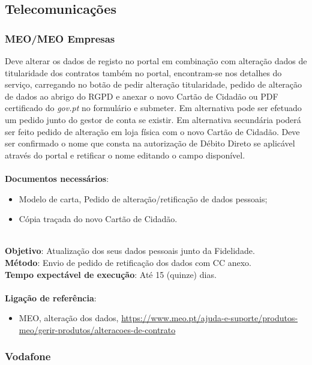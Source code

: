 \subsection{Telecomunicações}

\subsubsection{MEO/MEO Empresas}

Deve alterar os dados de registo no portal em combinação com alteração
dados de titularidade dos contratos também no portal, encontram-se nos
detalhes do serviço, carregando no botão de pedir alteração
titularidade, pedido de alteração de dados ao abrigo do RGPD e anexar o
novo Cartão de Cidadão ou PDF certificado do \emph{gov.pt} no formulário
e submeter. Em alternativa pode ser efetuado um pedido junto do gestor
de conta se existir. Em alternativa secundária poderá ser feito pedido
de alteração em loja física com o novo Cartão de Cidadão. Deve ser
confirmado o nome que consta na autorização de Débito Direto se
aplicável através do portal e retificar o nome editando o campo
disponível. \\
\\
\textbf{Documentos necessários}:
\begin{itemize}
	\item Modelo de carta, Pedido de alteração/retificação de dados pessoais;
	\item Cópia traçada do novo Cartão de Cidadão.
\end{itemize}
\leavevmode\\
\textbf{Objetivo}: Atualização dos seus dados pessoais junto da Fidelidade. \\
\textbf{Método}: Envio de pedido de retificação dos dados com CC anexo. \\
\textbf{Tempo expectável de execução}: Até 15 (quinze) dias. \\
\\
\textbf{Ligação de referência}:
\begin{itemize}
	\item MEO, alteração dos dados, \url{https://www.meo.pt/ajuda-e-suporte/produtos-meo/gerir-produtos/alteracoes-de-contrato}
\end{itemize}

\subsubsection{Vodafone}

